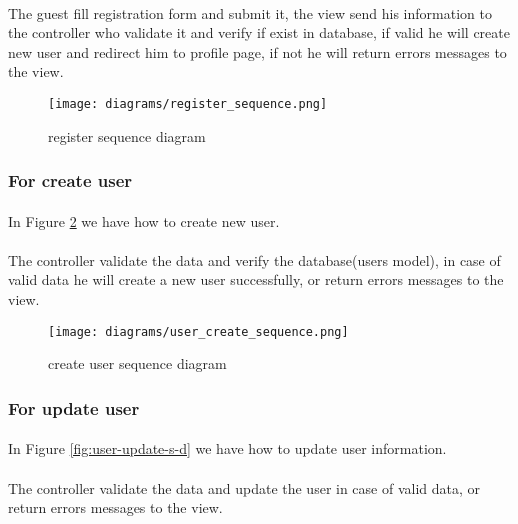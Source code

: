 	\paragraph{}
	The guest fill registration form and submit it, the view send his information to the controller who validate it and verify if exist in database, if valid he will create new user and redirect him to profile page, if not he will return errors messages to the view.
	
		\begin{figure}[!ht]
			\centering
			\texttt{[image: diagrams/register\_sequence.png]}
			\caption{register sequence diagram}
			\label{fig:register-s-d}
		\end{figure}
	
	\subsubsection{For create user}
	\paragraph{}
	In Figure \ref{fig:user-create-s-d} we have how to create new user.
	\paragraph{}
	The controller validate the data and verify the database(users model), in case of valid data he will create a new user successfully, or return errors messages to the view.
	
		\begin{figure}[!ht]
			\centering
			\texttt{[image: diagrams/user\_create\_sequence.png]}
			\caption{create user sequence diagram}
			\label{fig:user-create-s-d}
		\end{figure}
	
	\subsubsection{For update user}
	\paragraph{}
	In Figure \ref{fig:user-update-s-d} we have how to update user information.
	\paragraph{}
	The controller validate the data and update the user in case of valid data, or return errors messages to the view.
	
